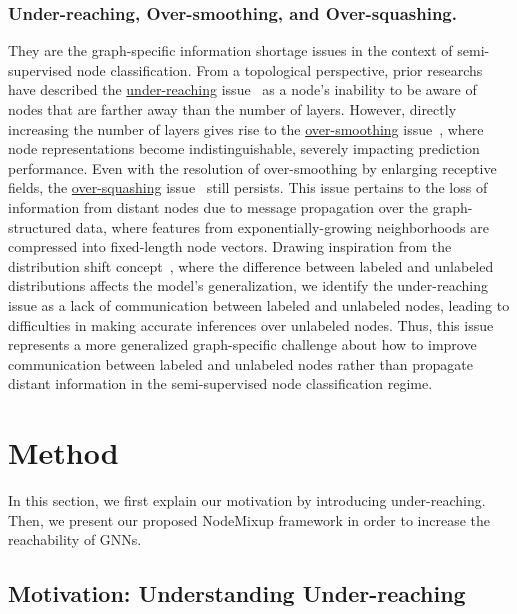 \documentclass[letterpaper]{article} %
\begin{document}
\subsubsection{Under-reaching, Over-smoothing, and Over-squashing.}
They are the graph-specific information shortage issues in the context of semi-supervised node classification. From a topological perspective, prior researchs have described the \underline{under-reaching} issue~\cite{pastel,rewiring,under_reaching} as a node's inability to be aware of nodes that are farther away than the number of layers. However, directly increasing the number of layers gives rise to the \underline{over-smoothing} issue~\cite{li2018deeper,oono2020graph,skipnode}, where node representations become indistinguishable, severely impacting prediction performance. Even with the resolution of over-smoothing by enlarging receptive fields, the \underline{over-squashing} issue~\cite{bottleneck,over,understanding-os} still persists. This issue pertains to the loss of information from distant nodes due to message propagation over the graph-structured data, where features from exponentially-growing neighborhoods are compressed into fixed-length node vectors. Drawing inspiration from the distribution shift concept~\cite{distribution_shift}, where the difference between labeled and unlabeled distributions affects the model's generalization, we identify the under-reaching issue as a lack of communication between labeled and unlabeled nodes, leading to difficulties in making accurate inferences over unlabeled nodes. Thus, this issue represents a more generalized graph-specific challenge about how to improve communication between labeled and unlabeled nodes rather than propagate distant information in the semi-supervised node classification regime.

\section{Method}
In this section, we first explain our motivation by introducing under-reaching. Then, we present our proposed NodeMixup framework in order to increase the reachability of GNNs.

\subsection{Motivation: Understanding Under-reaching}
\label{sec:under-reaching}
\end{document}
